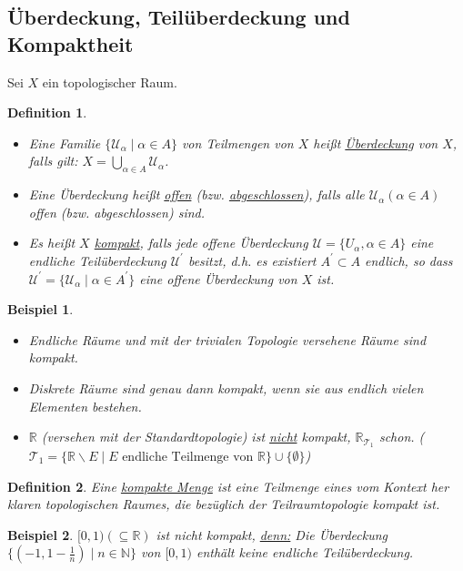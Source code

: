 \documentclass[a4paper,11pt,notitlepage]{report}
\newtheorem{definition}{Definition}[chapter]
\newtheorem{example}{Beispiel}[chapter]
\newcommand{\R}{{\ensuremath{\mathbb{R}}}}
\newcommand{\N}{{\ensuremath{\mathbb{N}}}}
\begin{document}
\subsection{Überdeckung, Teilüberdeckung und Kompaktheit}
Sei $X$ ein topologischer Raum.
\begin{definition}
	\begin{itemize}
		\item Eine Familie $\{\mathcal{U}_\alpha \mid \alpha \in A \}$ von Teilmengen von $X$ heißt \underline{Überdeckung} von $X$, falls gilt: $X = \bigcup\limits_{\alpha \in A}{\mathcal{U}_\alpha}$.
		\item Eine Überdeckung heißt \underline{offen} (bzw. \underline{abgeschlossen}), falls alle $\mathcal{U}_\alpha (\alpha \in A)$ offen (bzw. abgeschlossen) sind.
		\item Es heißt $X$ \underline{kompakt}, falls jede offene Überdeckung $\mathcal{U}=\{U_\alpha, \alpha \in A\}$ eine endliche Teilüberdeckung $\mathcal{U}^\prime$ besitzt, d.h. es existiert $A^\prime \subset A$ endlich, so dass $\mathcal{U}^\prime = \{\mathcal{U}_\alpha \mid \alpha \in A^\prime \}$ eine offene Überdeckung von $X$ ist.
	\end{itemize}
\end{definition}

\begin{example}
	\begin{itemize}
		\item Endliche Räume und mit der trivialen Topologie versehene Räume sind kompakt.
		\item Diskrete Räume sind genau dann kompakt, wenn sie aus endlich vielen Elementen bestehen.
		\item $\R$ (versehen mit der Standardtopologie) ist \underline{nicht} kompakt, $\R_{\mathcal{T}_1}$ schon. ($\mathcal{T}_1 = \{ \R \backslash E \mid E \text{ endliche Teilmenge von } \R \} \cup \{\emptyset\}$)
	\end{itemize}
\end{example}

\begin{definition}	Eine \underline{kompakte Menge} ist eine Teilmenge eines vom Kontext her klaren topologischen Raumes, die bezüglich der Teilraumtopologie kompakt ist.
\end{definition}

\begin{example}
	$[0,1) (\subseteq \R)$ ist nicht kompakt, \underline{denn:} Die Überdeckung $\{(-1,1-\frac{1}{n}) \mid n \in \N \}$ von $[0,1)$ enthält keine endliche Teilüberdeckung.
\end{example}
\end{document}
